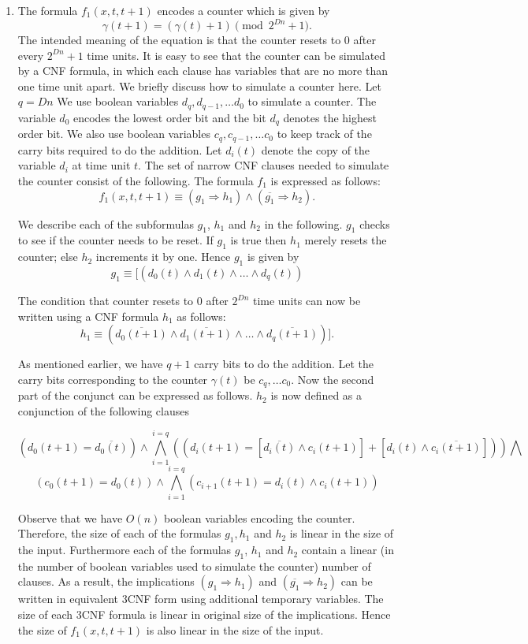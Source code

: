 \begin{enumerate}
\item 
The formula $f_1(x, t, t+1)$ encodes a counter which is given by 
\[\gamma(t + 1) =  (\gamma(t) + 1) \pmod{2^{Dn} +1}.\]
The intended meaning of the equation is  
that the counter resets to 0 after every $2^{Dn} +1$ time units.
It is easy to see that the counter 
can be simulated by a {\sf CNF} formula, in which each clause
has variables  that are no more than one time unit apart.
We briefly discuss how to simulate a counter here.  Let $q = Dn$
We use boolean
variables $d_q, d_{q-1}, \ldots d_0$ to simulate a counter.
The variable $d_0$ encodes the lowest order bit and the bit $d_q$ denotes the
highest order bit. We also use  boolean
variables $c_q, c_{q-1}, \ldots c_0$ to keep track of the carry bits 
required to do the addition. Let $d_i(t)$ denote
the copy of the variable $d_i$ at time unit $t$.
The set of narrow {\sf CNF} 
clauses needed to simulate the  counter  consist of the following.
The formula $f_1$ is expressed as follows:
\[f_1(x,t, t+1) \equiv (g_1 \Rightarrow h_1) \wedge (\overline{g_1} \Rightarrow h_2).\]

We describe each of the subformulas $g_1$, $h_1$ and $h_2$ in the 
following.
$g_1$ checks to see if the counter needs to be reset. If $g_1$ is true then
$h_1$ merely resets the counter; else $h_2$ increments it by one.
Hence $g_1$ is given by 
\[g_1  \equiv [(d_0(t) \wedge d_1(t) \wedge \ldots \wedge d_q(t) )\] 

The condition that counter resets to 0 after $2^{Dn}$ time units can now
be written using a CNF  formula $h_1$ as follows:
\[ h_1 \equiv (\overline{d_0(t+1)} \wedge \overline{d_1(t+1)} \wedge  
\ldots \wedge \overline{d_q(t+1)})].\]

As mentioned  earlier,
we have $q+1$ carry bits to do the addition. Let the carry bits
corresponding to the counter $\gamma(t)$ be $c_q, \ldots c_0$. Now the second 
part of the conjunct can be expressed as follows. $h_2$ is now defined
as a conjunction of the following clauses

\[\left(d_0(t+1) = \overline{d_0(t)} \right) \wedge
\bigwedge_{i= 1 }^{i = q} 
\left((d_i(t+1) = [\overline{d_i(t)} \wedge c_i(t+1)]+
               [d_i(t) \wedge \overline{c_i(t+1)}]) \right)\bigwedge \]
\[\left( c_0(t+1) = d_0(t) \right) \wedge  \bigwedge_{i =1}^{ i = q}  
\left(c_{i+1}(t+1) = d_i(t) \wedge c_i(t+1) \right) \]

Observe that we have $O(n)$ boolean variables encoding the counter.
Therefore, the size of each of the formulas $g_1, h_1$ and $h_2$ is linear
in the size of the input.
Furthermore each of the formulas $g_1$, $h_1$ and $h_2$ contain a linear
(in the number of boolean variables used to simulate the counter)  number
of clauses.  As a result, the implications 
$ (g_1 \Rightarrow h_1)$ and $(\overline{g_1} \Rightarrow h_2)$ can be written
in equivalent {\sf 3CNF} form using additional temporary variables.
The size of each {\sf 3CNF} formula is linear in original size of
the implications. 
Hence the size of $f_1(x,t,t+1)$ is also linear
in the size of the input. 



\end{enumerate}
